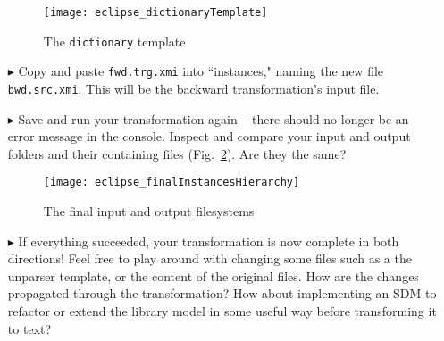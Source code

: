 \begin{itemize}
\vspace{0.5cm}

\begin{figure}[htpb]
\begin{center}
  \texttt{[image: eclipse\_dictionaryTemplate]}
  \caption{The \texttt{dictionary} template}
  \label{eclipse:dictionaryTemplate}
\end{center}
\end{figure}

\item[$\blacktriangleright$] Copy and paste \texttt{fwd.trg.xmi} into ``instances," naming the new file \texttt{bwd.src.xmi}. This will be the backward
transformation's input file.

\item[$\blacktriangleright$] Save and run your transformation again -- there should no longer be an error message in the console. Inspect and compare your input
and output folders and their containing files (Fig.~\ref{eclipse:unparseResult}). Are they the same?

\vspace{0.5cm}

\begin{figure}[htpb]
\begin{center}
  \texttt{[image: eclipse\_finalInstancesHierarchy]}
  \caption{The final input and output filesystems}
  \label{eclipse:unparseResult}
\end{center}
\end{figure}

\item[$\blacktriangleright$] If everything succeeded, your transformation is now complete in both directions! Feel free to play around with
changing some files such as a the unparser template, or the content of the original files. How are the changes propagated through the transformation?
How about implementing an SDM to refactor or extend the library model in some useful way before transforming it to text?

\end{itemize}